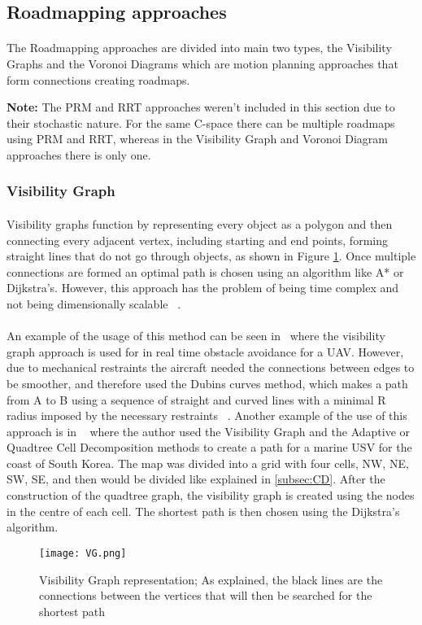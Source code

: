 \subsection{Roadmapping approaches}
\label{subsec:RA}
\paragraph{}The Roadmapping approaches are divided into main two types, the Visibility Graphs and the Voronoi Diagrams which are motion planning approaches
that form connections creating roadmaps. 

\textbf{Note:} The \gls{PRM} and \gls{RRT} approaches weren't included in this section due to their stochastic nature. For the same C-space there
can be multiple roadmaps using PRM and \gls{RRT}, whereas in the Visibility Graph and Voronoi Diagram approaches there is only one.
\subsubsection{Visibility Graph}
\label{subsubsec:VG}
\paragraph{}Visibility graphs function by
representing every object as a polygon and then connecting every adjacent vertex, including starting and end points, 
forming straight lines that do not go through objects, as shown in Figure \ref{fig:VG}. Once multiple connections are formed an optimal path is chosen using an algorithm like A* or 
Dijkstra's. However, this approach has the problem of being time complex and not being dimensionally scalable ~\cite{sym10100450}. 
\paragraph{}An example of the usage of this method can be seen in~\cite{app10165613} where the visibility graph approach is used for in real time
obstacle avoidance for a \gls{UAV}. However, due to mechanical restraints the aircraft needed the connections between edges to be smoother, and therefore
used the Dubins curves method, which makes a path from A to B using a sequence of straight and curved lines with a minimal R radius 
imposed by the necessary restraints ~\cite{aac5c909-7434-3d95-961b-caf3aec6a743}.
Another example of the use of this approach is in ~\cite{LEE2021102887} where the author used the Visibility Graph and the Adaptive or Quadtree Cell Decomposition
methods  to create a path for a marine USV for the coast of South Korea. The map was divided into a grid with four cells, NW, NE, SW, SE, and then would
be divided like explained in \ref{subsec:CD}. After the construction of the quadtree graph, the visibility graph is created using
the nodes in the centre of each cell. The shortest path is then chosen using the Dijkstra's algorithm.
\begin{figure}[h]
    \centering
    \texttt{[image: VG.png]}
    \caption{Visibility Graph representation; As explained, the black lines are the connections between the vertices that will then be searched for the shortest path}
    \label{fig:VG}
\end{figure}
